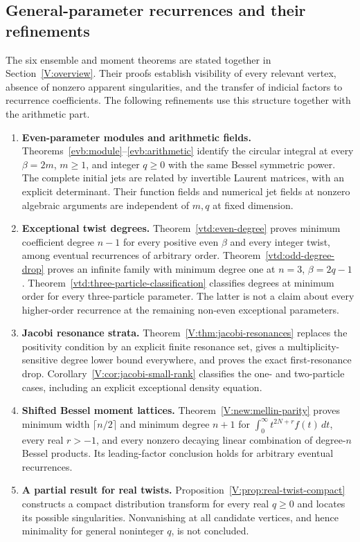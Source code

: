 \documentclass[11pt,a4paper]{article}
\theoremstyle{definition}
\theoremstyle{remark}
\numberwithin{equation}{section}
\begin{document}
\subsection*{General-parameter recurrences and their refinements}
The six ensemble and moment theorems are stated together in
Section~\ref{V:overview}. Their proofs establish visibility of every
relevant vertex, absence of nonzero apparent singularities, and the
transfer of indicial factors to recurrence coefficients. The following
refinements use this structure together with the arithmetic part.
\begin{enumerate}[leftmargin=*]
\item \textbf{Even-parameter modules and arithmetic fields.}
Theorems~\ref{evb:module}--\ref{evb:arithmetic} identify the circular
integral at every $\beta=2m$, $m\ge1$, and integer $q\ge0$ with the
same Bessel symmetric power. The complete initial jets are related by
invertible Laurent matrices, with an explicit determinant. Their
function fields and numerical jet fields at nonzero algebraic arguments
are independent of $m,q$ at fixed dimension.
\item \textbf{Exceptional twist degrees.}
Theorem~\ref{vtd:even-degree} proves minimum coefficient degree $n-1$
for every positive even $\beta$ and every integer twist, among eventual
recurrences of arbitrary order. Theorem~\ref{vtd:odd-degree-drop}
proves an infinite family with minimum degree one at $n=3$,
$\beta=2q-1$. Theorem~\ref{vtd:three-particle-classification}
classifies degrees at minimum order for every three-particle parameter.
The latter is not a claim about every higher-order recurrence at the
remaining non-even exceptional parameters.
\item \textbf{Jacobi resonance strata.}
Theorem~\ref{V:thm:jacobi-resonances} replaces the positivity condition
by an explicit finite resonance set, gives a multiplicity-sensitive
degree lower bound everywhere, and proves the exact first-resonance
drop. Corollary~\ref{V:cor:jacobi-small-rank} classifies the one- and
two-particle cases, including an explicit exceptional density equation.
\item \textbf{Shifted Bessel moment lattices.}
Theorem~\ref{V:new:mellin-parity} proves minimum width
$\lceil n/2\rceil$ and minimum degree $n+1$ for
$\int_0^\infty t^{2N+r}f(t)\,dt$, every real $r>-1$, and every nonzero
decaying linear combination of degree-$n$ Bessel products. Its
leading-factor conclusion holds for arbitrary eventual recurrences.
\item \textbf{A partial result for real twists.}
Proposition~\ref{V:prop:real-twist-compact} constructs a compact
distribution transform for every real $q\ge0$ and locates its possible
singularities. Nonvanishing at all candidate vertices, and hence
minimality for general noninteger $q$, is not concluded.
\end{enumerate}
\end{document}
